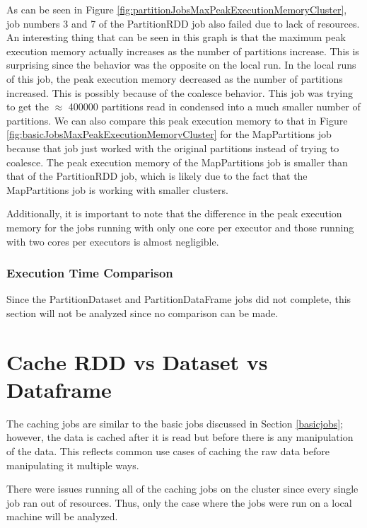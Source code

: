 \documentclass[conference]{IEEEtran}
\begin{document}
As can be seen in Figure \ref{fig:partitionJobsMaxPeakExecutionMemoryCluster}, job numbers 3 and 7 of the PartitionRDD job also failed due to lack of resources.
An interesting thing that can be seen in this graph is that the maximum peak execution memory actually increases as the number of partitions increase.
This is surprising since the behavior was the opposite on the local run.
In the local runs of this job, the peak execution memory decreased as the number of partitions increased.
This is possibly because of the coalesce behavior.
This job was trying to get the $\approx$ 400000 partitions read in condensed into a much smaller number of partitions.
We can also compare this peak execution memory to that in Figure \ref{fig:basicJobsMaxPeakExecutionMemoryCluster} for the MapPartitions job because that job just worked with the original partitions instead of trying to coalesce.
The peak execution memory of the MapPartitions job is smaller than that of the PartitionRDD job, which is likely due to the fact that the MapPartitions job is working with smaller clusters.

Additionally, it is important to note that the difference in the peak execution memory for the jobs running with only one core per executor and those running with two cores per executors is almost negligible.

\subsubsection{Execution Time Comparison}
Since the PartitionDataset and PartitionDataFrame jobs did not complete, this section will not be analyzed since no comparison can be made.

\section{Cache RDD vs Dataset vs Dataframe}
The caching jobs are similar to the basic jobs discussed in Section \ref{basicjobs}; however, the data is cached after it is read but before there is any manipulation of the data.
This reflects common use cases of caching the raw data before manipulating it multiple ways.

There were issues running all of the caching jobs on the cluster since every single job ran out of resources.
Thus, only the case where the jobs were run on a local machine will be analyzed.
\end{document}

